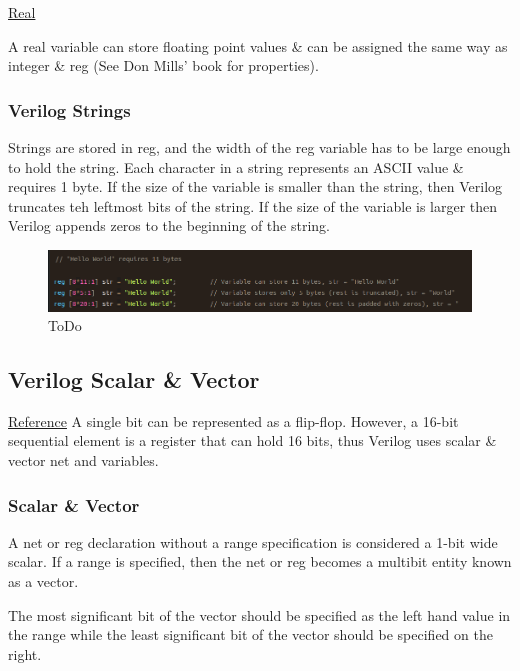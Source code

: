 \documentclass{article}
\begin{document}
	\underline{Real} \newline \newline

	A real variable can store floating point values \& can be assigned the same way as integer \& reg (See Don Mills' book for properties).

	\subsubsection{Verilog Strings}

	Strings are stored in reg, and the width of the reg variable has to be large enough to hold the string. Each character in a string represents an ASCII value \& requires 1 byte. If the size of the
	variable is smaller than the string, then Verilog truncates teh leftmost bits of the string. If the size of the variable is larger then Verilog appends zeros to the beginning of the string.

	\begin{figure}[H]
		\includegraphics[width=\linewidth]{VerilogPics/figure_14.png}
		\caption{ToDo}
		\label{ToDo}
	\end{figure}

	\subsection{Verilog Scalar \& Vector}

	\href{https://www.chipverify.com/verilog/verilog-scalar-vector}{Reference}
	A single bit can be represented as a flip-flop. However, a 16-bit sequential element is a register that can hold 16 bits, thus Verilog uses scalar \& vector net and variables.

	\subsubsection{Scalar \& Vector}

	A net or reg declaration without a range specification is considered a 1-bit wide scalar. If a range is specified, then the net or reg becomes a multibit entity known as a vector. \newline \newline

	The most significant bit of the vector should be specified as the left hand value in the range while the least significant bit of the vector should be specified on the right.
\end{document}
